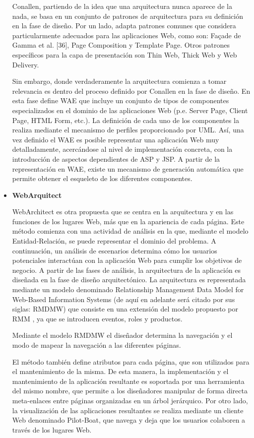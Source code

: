 \begin{itemize}
Conallen, partiendo de la idea que una arquitectura nunca aparece de la nada, se
basa en un conjunto de patrones de arquitectura para su definición en la fase de
diseño. Por un lado, adapta patrones comunes que considera particularmente
adecuados para las aplicaciones Web, como son: Façade de Gamma et al. [36], Page
Composition y Template Page. Otros patrones específicos para la capa
de presentación son Thin Web, Thick Web y Web Delivery.

Sin embargo, donde verdaderamente la arquitectura comienza a tomar relevancia
es dentro del proceso definido por Conallen en la fase de diseño. En esta fase
define WAE que incluye un conjunto de tipos de componentes especializados en el
dominio de las aplicaciones Web (p.e. Server Page, Client Page, HTML Form,
etc.). La definición de cada uno de los componentes la realiza mediante el
mecanismo de perfiles proporcionado por UML. Así, una vez definido el WAE es posible representar una
aplicación Web muy detalladamente, acercándose al nivel de implementación
concreta, con la introducción de aspectos dependientes de ASP y JSP.
A partir de la representación en WAE, existe un mecanismo de generación
automática que permite obtener el esqueleto de los diferentes componentes.

\item \textbf{WebArquitect}

WebArchitect \cite{112} es otra propuesta que se centra en la arquitectura y en las
funciones de los lugares Web, más que en la apariencia de cada página. Este
método comienza con una actividad de análisis en la que, mediante el modelo
Entidad-Relación, se puede representar el dominio del problema. A continuación, un
análisis de escenarios determina cómo los usuarios potenciales interactúan con
la aplicación Web para cumplir los objetivos de negocio. A partir de las fases
de análisis, la arquitectura de la aplicación es diseñada en la fase de diseño
arquitectónico. La arquitectura es representada mediante un modelo denominado Relationship Management Data Model for Web-Based Information Systems (de aquí en adelante será citado por sus siglas: RMDMW) que
consiste en una extensión del modelo propuesto por RMM \cite{48}, ya que se introducen eventos, roles y productos.

Mediante el modelo RMDMW el diseñador determina la navegación y el modo de mapear la
navegación a las diferentes páginas.

El método también define atributos para cada página, que son utilizados para el
mantenimiento de la misma. De esta manera, la  implementación y el mantenimiento de la aplicación
resultante es soportada por una herramienta del mismo nombre, que permite a los
diseñadores manipular de forma directa meta-enlaces entre páginas organizadas en
un árbol jerárquico. Por otro lado, la visualización de las aplicaciones
resultantes se realiza mediante un cliente Web denominado Pilot-Boat, que navega
y deja que los usuarios colaboren a través de los lugares Web.


\end{itemize}
